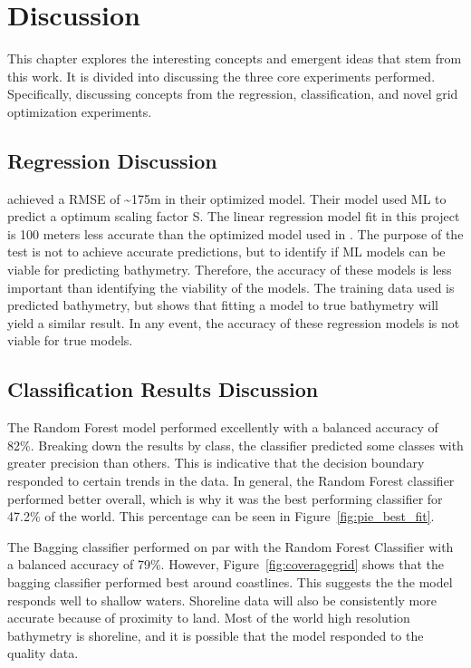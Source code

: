 \section{Discussion}
\setlength{\parindent}{10ex}
This chapter explores the interesting concepts and emergent ideas that stem from this work.
It is divided into discussing the three core experiments performed.
Specifically, discussing concepts from the regression, classification, and novel grid optimization experiments.

\subsection{Regression Discussion}
\cite{jena2012prediction} achieved a \ac{RMSE} of \~{}175m in their optimized model.
Their model used \ac{ML} to predict a optimum scaling factor S\@.
The linear regression model fit in this project is 100 meters less accurate than the optimized model used in \cite{jena2012prediction}.
The purpose of the test is not to achieve accurate predictions, but to identify if \ac{ML} models can be viable for predicting bathymetry.
Therefore, the accuracy of these models is less important than identifying the viability of the models.
The training data used is predicted bathymetry, but shows that fitting a model to true bathymetry will yield a similar result.
In any event, the accuracy of these regression models is not viable for true models.

\subsection{Classification Results Discussion}
The Random Forest model performed excellently with a balanced accuracy of 82\%.
Breaking down the results by class, the classifier predicted some classes with greater precision than others.
This is indicative that the decision boundary responded to certain trends in the data.
In general, the Random Forest classifier performed better overall, which is why it was the best performing classifier for 47.2\% of the world.
This percentage can be seen in Figure~\ref{fig:pie_best_fit}.

\par
The Bagging classifier performed on par with the Random Forest Classifier with a balanced accuracy of 79\%.
However, Figure~\ref{fig:coveragegrid} shows that the bagging classifier performed best around coastlines.
This suggests the the model responds well to shallow waters.
Shoreline data will also be consistently more accurate because of proximity to land.
Most of the world high resolution bathymetry is shoreline, and it is possible that the model responded to the quality data.


